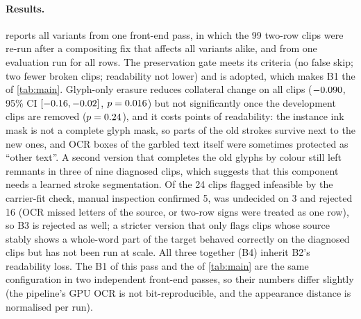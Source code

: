 \paragraph{Results.}  reports all variants from one front-end pass, in which the 99 two-row clips were re-run after a compositing fix that affects all variants alike, and from one evaluation run for all rows. The preservation gate meets its criteria (no false skip; two fewer broken clips; readability not lower) and is adopted, which makes B1 the \method of \cref{tab:main}. Glyph-only erasure reduces collateral change on all clips ($-0.090$, 95\% CI $[-0.16, -0.02]$, $p=0.016$) but not significantly once the development clips are removed ($p=0.24$), and it costs \sBtwoCost{} points of readability: the instance ink mask is not a complete glyph mask, so parts of the old strokes survive next to the new ones, and OCR boxes of the garbled text itself were sometimes protected as ``other text''. A second version that completes the old glyphs by colour still left remnants in three of nine diagnosed clips, which suggests that this component needs a learned stroke segmentation. Of the 24 clips flagged infeasible by the carrier-fit check, manual inspection confirmed 5, was undecided on 3 and rejected 16 (OCR missed letters of the source, or two-row signs were treated as one row), so B3 is rejected as well; a stricter version that only flags clips whose source stably shows a whole-word part of the target behaved correctly on the diagnosed clips but has not been run at scale. All three together (B4) inherit B2's readability loss. The B1 of this pass and the \method of \cref{tab:main} are the same configuration in two independent front-end passes, so their numbers differ slightly (the pipeline's GPU OCR is not bit-reproducible, and the appearance distance is normalised per run).
